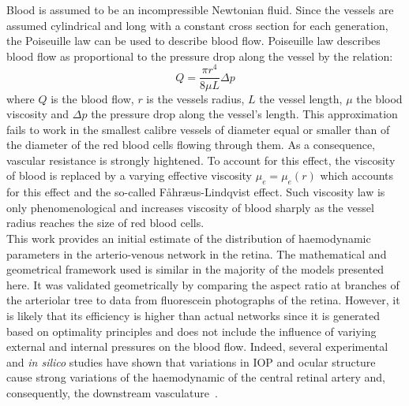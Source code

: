 \documentclass[12pt,a4paper]{article}
\begin{document}
Blood is assumed to be an incompressible Newtonian fluid.
Since the vessels are assumed cylindrical and long with a constant cross section for each generation, the Poiseuille law can be used to describe blood flow.
Poiseuille law describes blood flow as proportional to the pressure drop along the vessel by the relation:
\begin{equation}
  \label{eq:PoiseuilleLaw}
  Q = \frac{\pi r^4}{8\mu L}\Delta p
\end{equation}
where $Q$ is the blood flow, $r$ is the vessels radius, $L$ the vessel length, $\mu$ the blood viscosity and $\Delta p$ the pressure drop along the vessel's length.
This approximation fails to work in the smallest calibre vessels of diameter equal or smaller than of the diameter of the red blood cells flowing through them.
As a consequence, vascular resistance is strongly hightened.
To account for this effect, the viscosity of blood is replaced by a varying effective viscosity $\mu_e = \mu_e(r)$ which accounts for this effect and the so-called F\r{a}hr\ae us-Lindqvist effect.
Such viscosity law is only phenomenological and increases viscosity of blood sharply as the vessel radius reaches the size of red blood cells.\\
This work provides an initial estimate of the distribution of haemodynamic parameters in the arterio-venous network in the retina.
The mathematical and geometrical framework used is similar in the majority of the models presented here. 
It was validated geometrically by comparing the aspect ratio at branches of the arteriolar tree to data from fluorescein photographs of the retina. 
However, it is likely that its efficiency is higher than actual networks since it is generated based on optimality principles and does not include the influence of variying external and internal pressures on the blood flow.
Indeed, several experimental and \textit{in silico} studies have shown that variations in IOP and ocular structure cause strong variations of the haemodynamic of the central retinal artery and, consequently, the downstream vasculature~\cite{Guidoboni_2014, Harris_1996}.
\end{document}
